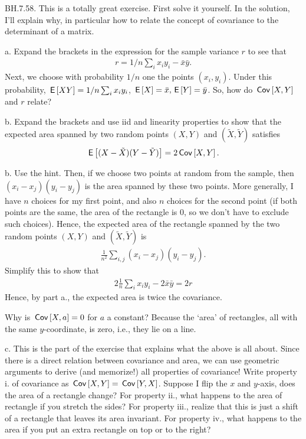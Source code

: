 \setcounter{theorem}{57}
\begin{exercise}
BH.7.58.
This is a totally great exercise. First solve it yourself. In the solution, I'll explain why, in particular how to relate the concept of covariance to the determinant of a matrix.

\begin{hint}
a. Expand the brackets in the expression for the sample variance $r$ to see that
\begin{align*}
r = 1/n \sum_i x_i y_i - \bar x \bar y.
\end{align*}
Next, we choose with probability $1/n$ one the points $(x_i, y_{i})$.  Under this probability, $\,\mathsf{E}\left[X Y\right] = 1/n \sum_i x_i y_i$, $\,\mathsf{E}\left[X\right] = \bar x, \,\mathsf{E}\left[Y\right] = \bar y$. So, how do $\,\mathsf{Cov}\left[X,Y\right]$ and $r$ relate?


b. Expand the brackets and use iid and linearity properties to show that the expected area spanned by two random points $(X,Y)$ and $(\tilde X, \tilde Y)$ satisfies
\begin{align*}
\,\mathsf{E}\left[(X-\tilde X)(Y-\tilde Y)\right] = 2\,\mathsf{Cov}\left[X,Y\right].
\end{align*}

\end{hint}
\begin{solution}

b. Use the hint. Then, if we choose two points at random from the sample, then $(x_i-x_j)(y_i-y_j)$ is the area spanned by these  two points.
More generally, I have $n$ choices for my first point, and also $n$ choices for the second point (if both points are the same, the area of the rectangle is 0, so we don't have to exclude such choices).
Hence, the expected area of the rectangle spanned by the two random points $(X,Y)$ and $(\tilde X, \tilde Y)$ is
\begin{align*}
\frac 1 {n^2} \sum_{i,j} (x_i-x_j)(y_i-y_j).
\end{align*}
Simplify this to show that
\begin{align*}
2 \frac 1 n \sum_i x_i y_i - 2 \bar x \bar y = 2 r
\end{align*}
Hence, by part a., the expected area is twice the covariance.

Why is $\,\mathsf{Cov}\left[X,a\right]= 0$ for $a$ a constant? Because the `area' of rectangles, all with the same \(y\)-coordinate, is zero, i.e., they lie on a line.

c.  This is the part of the exercise that explains what the above is all about.
Since there is a direct relation between covariance and area, we can use geometric arguments to derive (and memorize!) all properties of covariance! Write property i. of covariance  as $\,\mathsf{Cov}\left[X,Y\right] = \,\mathsf{Cov}\left[Y,X\right]$. Suppose I flip the \(x\) and \(y\)-axis, does the area of a rectangle change?  For property ii., what happens to the area of rectangle if you stretch the sides? For property iii., realize that this is just a shift of a rectangle that leaves its area invariant. For property iv., what happens to the area if you put an extra rectangle on top or to the right?


\end{solution}
\end{exercise}
